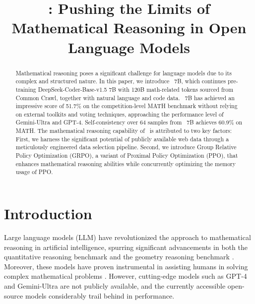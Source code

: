 \title{: Pushing the Limits of Mathematical Reasoning in Open Language Models}

\begin{abstract}
Mathematical reasoning poses a significant challenge for language models due to its complex and structured nature. 
In this paper, we introduce \spmath~7B, which continues pre-training DeepSeek-Coder-Base-v1.5 7B  with 120B math-related tokens sourced from Common Crawl, together with natural language and code data. \spmath~7B has achieved an impressive score of 51.7\% on the competition-level MATH benchmark without relying on external toolkits and voting techniques, approaching the performance level of Gemini-Ultra and GPT-4.  Self-consistency over 64 samples from \spmath~7B achieves 60.9\% on MATH. 
The mathematical reasoning capability of \spmath~is attributed to two key factors: First, we harness the significant potential of publicly available web data through a meticulously engineered data selection pipeline. Second, we introduce Group Relative Policy Optimization (GRPO), a variant of Proximal Policy Optimization (PPO), that enhances mathematical reasoning abilities while concurrently optimizing the memory usage of PPO.
\end{abstract}

\section{Introduction}

Large language models (LLM) have revolutionized the approach to mathematical reasoning in artificial intelligence, spurring significant advancements in both the quantitative reasoning benchmark \citep{MATH} and the geometry reasoning benchmark \citep{trinh2024solving}. Moreover, these models have proven instrumental in assisting humans in solving complex mathematical problems \citep{tao}. However, cutting-edge models such as GPT-4 \citep{gpt4} and Gemini-Ultra \citep{gemini} are not publicly available, and the currently accessible open-source models considerably trail behind in performance.

